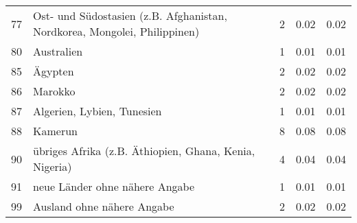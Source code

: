 \begin{longtable}{lXrrr}
        77 & \multicolumn{1}{X}{Ost- und Südostasien (z.B. Afghanistan, Nordkorea, Mongolei, Philippinen)} & %
          \num{2} &
          \num[round-mode=places,round-precision=2]{0,02} &
          \num[round-mode=places,round-precision=2]{0,02} \\

        80 & \multicolumn{1}{X}{Australien} & %
          \num{1} &
          \num[round-mode=places,round-precision=2]{0,01} &
          \num[round-mode=places,round-precision=2]{0,01} \\

        85 & \multicolumn{1}{X}{Ägypten} & %
          \num{2} &
          \num[round-mode=places,round-precision=2]{0,02} &
          \num[round-mode=places,round-precision=2]{0,02} \\

        86 & \multicolumn{1}{X}{Marokko} & %
          \num{2} &
          \num[round-mode=places,round-precision=2]{0,02} &
          \num[round-mode=places,round-precision=2]{0,02} \\

        87 & \multicolumn{1}{X}{Algerien, Lybien, Tunesien} & %
          \num{1} &
          \num[round-mode=places,round-precision=2]{0,01} &
          \num[round-mode=places,round-precision=2]{0,01} \\

        88 & \multicolumn{1}{X}{Kamerun} & %
          \num{8} &
          \num[round-mode=places,round-precision=2]{0,08} &
          \num[round-mode=places,round-precision=2]{0,08} \\

        90 & \multicolumn{1}{X}{übriges Afrika (z.B. Äthiopien, Ghana, Kenia, Nigeria)} & %
          \num{4} &
          \num[round-mode=places,round-precision=2]{0,04} &
          \num[round-mode=places,round-precision=2]{0,04} \\

        91 & \multicolumn{1}{X}{neue Länder ohne nähere Angabe} & %
          \num{1} &
          \num[round-mode=places,round-precision=2]{0,01} &
          \num[round-mode=places,round-precision=2]{0,01} \\

        99 & \multicolumn{1}{X}{Ausland ohne nähere Angabe} & %
          \num{2} &
          \num[round-mode=places,round-precision=2]{0,02} &
          \num[round-mode=places,round-precision=2]{0,02} \\


\end{longtable}
